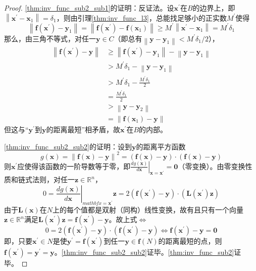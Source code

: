 \documentclass[main.tex]{subfiles}
\begin{document}
\begin{proof}
\ref{thm:inv_func_sub2_sub1}的证明：反证法。设$\mathbf{x}^\prime$在$B$的边界上，即$\left\|\mathbf{x}^\prime-\mathbf{x}_1\right\|=\delta_1$，则由引理\ref{thm:inv_func_l3}，总能找足够小的正实数$M^\prime$使得
\[\left\|\mathbf{f}\left(\mathbf{x}^\prime\right)-\mathbf{y}_1\right\|=\left\|\mathbf{f}\left(\mathbf{x}^\prime\right)-\mathbf{f}\left(\mathbf{x}_1\right)\right\|\geq M^\prime\left\|\mathbf{x}^\prime-\mathbf{x}_1\right\|=M^\prime\delta_1
\]
那么，由三角不等式，对任一$\mathbf{y}\in C$（即总有$\left\|\mathbf{y}-\mathbf{y}_1\right\|<M^\prime\delta_1/2$），
\begin{align*}
\left\|\mathbf{f}\left(\mathbf{x}^\prime\right)-\mathbf{y}\right\|&\geq\left\|\mathbf{f}\left(\mathbf{x}^\prime\right)-\mathbf{y}_1\right\|-\left\|\mathbf{y}-\mathbf{y}_1\right\|\\
&>M^\prime\delta_1-\left\|\mathbf{y}-\mathbf{y}_1\right\|\\
&>M^\prime\delta_1-\frac{M^\prime\delta_1}{2}\\
&=\frac{M^\prime\delta_1}{2}\\
&>\left\|\mathbf{y}-\mathbf{y}_2\right\|\\
&=\left\|\mathbf{f}\left(\mathbf{x}_1\right)-\mathbf{y}\right\|
\end{align*}
但这与“$\mathbf{y}^\prime$到$\mathbf{y}$的距离最短”相矛盾，故$\mathbf{x}^\prime$在$B$的内部。

\ref{thm:inv_func_sub2_sub2}的证明：设到$\mathbf{y}$的距离平方函数
\[
g\left(\mathbf{x}\right)=\left\|\mathbf{f}\left(\mathbf{x}\right)-\mathbf{y}\right\|^2=\left(\mathbf{f}\left(\mathbf{x}\right)-\mathbf{y}\right)\cdot\left(\mathbf{f}\left(\mathbf{x}\right)-\mathbf{y}\right)\]
则$\mathbf{x}^\prime$应使得该函数的一阶导数等于零，即$\left.\frac{dg\left(\mathbf{x}\right)}{d\mathbf{x}}\right|_{\mathbf{x}=\mathbf{x}^\prime}=\mathbf{0}$（零变换）。由零变换性质和链式法则，对任一$\mathbf{z}\in\mathbb{R}^n$，
\[0=\left.\frac{dg\left(\mathbf{x}\right)}{d\mathbf{x}}\right|_{mathbf{x}=\mathbf{x}^\prime}\mathbf{z}=2\left(\mathbf{f}\left(\mathbf{x}^\prime\right)-\mathbf{y}\right)\cdot\left(\mathbf{L}\left(\mathbf{x}^\prime\right)\mathbf{z}\right)\]
由于$\mathbf{L}\left(\mathbf{x}\right)$在$N$上的每个值都是双射（同构）线性变换，故有且只有一个向量$\mathbf{z}\in\mathbb{R}^n$满足$\mathbf{L}\left(\mathbf{x}^\prime\right)\mathbf{z}=\mathbf{f}\left(\mathbf{x}^\prime\right)-\mathbf{y}$。故上式$\Leftrightarrow$
\[0=2\left(\mathbf{f}\left(\mathbf{x}^\prime\right)-\mathbf{y}\right)\cdot\left(\mathbf{f}\left(\mathbf{x}^\prime\right)-\mathbf{y}\right)\Leftrightarrow\mathbf{f}\left(\mathbf{x}^\prime\right)-\mathbf{y}=\mathbf{0}\]
即，只要$\mathbf{x}^\prime\in N$是使$\mathbf{y}^\prime=\mathbf{f}\left(\mathbf{x}^\prime\right)$到任一$\mathbf{y}\in \mathbf{f}\left(N\right)$的距离最短的点，则$\mathbf{f}\left(\mathbf{x}^\prime\right)=\mathbf{y}^\prime=\mathbf{y}$。\ref{thm:inv_func_sub2_sub2}证毕。\ref{thm:inv_func_sub2}证毕。


\end{proof}
\end{document}
